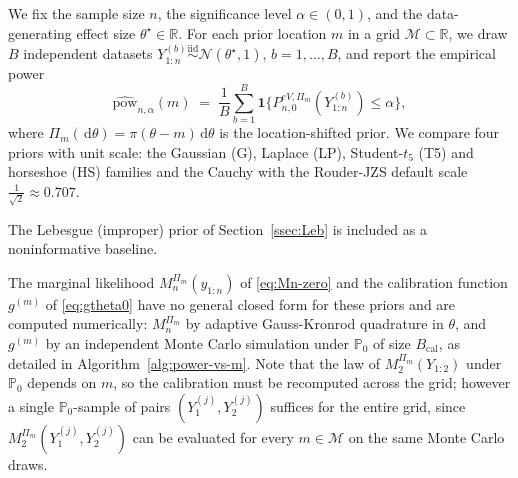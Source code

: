 \documentclass{article}%
\newcommand{\Prob}{\mathbb{P}}
\newcommand{\dd}{\,\mathrm{d}}
\newcommand{\1}{\mathbf{1}}
\begin{document}
We fix the sample size \(n\), the significance level
\(\alpha\in(0,1)\), and the data-generating effect size
\(\theta^\star\in\mathbb{R}\). For each prior location \(m\) in a grid
\(\mathcal M\subset\mathbb{R}\), we draw \(B\) independent datasets
\(Y_{1:n}^{(b)}\stackrel{\mathrm{iid}}{\sim}\mathcal
N(\theta^\star,1)\), \(b=1,\ldots,B\), and report the empirical power
\begin{equation}\label{eq:power-def}
   \widehat{\mathrm{pow}}_{n,\alpha}(m)
   \;=\;\frac{1}{B}\sum_{b=1}^B
       \mathbf 1\!\bigl\{P_{n,0}^{eV,\Pi_m}(Y_{1:n}^{(b)})\leq\alpha\bigr\},
\end{equation}
where \(\Pi_m(\dd\theta)=\pi(\theta-m)\dd\theta\) is the
location-shifted prior. We compare four priors with unit scale: the Gaussian (G), Laplace (LP), Student-\(t_5\) (T5) and horseshoe (HS) families and the Cauchy with the Rouder-JZS default scale $\frac{1}{\sqrt{2}} \approx 0.707$.


The Lebesgue (improper) prior of
Section~\ref{ssec:Leb} is included as a noninformative baseline.

The marginal likelihood \(M_n^{\Pi_m}(y_{1:n})\) of \eqref{eq:Mn-zero} and the calibration function \(g^{(m)}\) of \eqref{eq:gtheta0} have no general closed form for these priors and are computed numerically: \(M_n^{\Pi_m}\) by adaptive Gauss-Kronrod quadrature \citep{piessens2012quadpack} in \(\theta\), and \(g^{(m)}\) by an independent Monte Carlo simulation under \(\Prob_0\) of size
\(B_{\mathrm{cal}}\), as detailed in Algorithm~\ref{alg:power-vs-m}. Note that the law of \(M_2^{\Pi_m}(Y_{1:2})\) under \(\Prob_0\) depends on \(m\), so the calibration must be recomputed across the grid; however a single \(\Prob_0\)-sample of pairs \((Y_1^{(j)},Y_2^{(j)})\) suffices for the entire grid, since \(M_2^{\Pi_m}(Y_1^{(j)},Y_2^{(j)})\) can be evaluated for every \(m\in\mathcal M\) on the same Monte Carlo draws.
\end{document}
